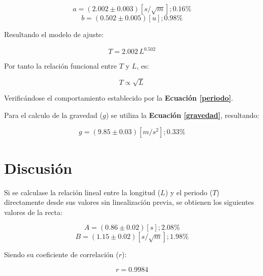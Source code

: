 \documentclass[letter,11pt]{article}
\begin{document}
\begin{equation*}
    a = (2.002 \pm 0.003) [s/\sqrt{m}]; 0.16\%
\end{equation*}
\begin{equation*}
    b = (0.502 \pm 0.005) [u]; 0.98\%
\end{equation*}
\vspace{0.10cm}

Resultando el modelo de ajuste:

\begin{equation*}
    T = 2.002\,L^{0.502}
\end{equation*}
\vspace{0.10cm}

Por tanto la relación funcional entre $T$ y $L$, es:

\begin{equation*}
    T \propto \sqrt{L}
\end{equation*}
\vspace{0.10cm}

Verificándose el comportamiento establecido por la
\textbf{Ecuación \ref{periodo}}.

Para el calculo de la gravedad ($g$) se utiliza la
\textbf{Ecuación \ref{gravedad}}, resultando:

\begin{equation*}
    g = (9.85 \pm 0.03) [m/s^2]; 0.33\%
\end{equation*}
\vspace{0.10cm}

\section{Discusión}

Si se calculase la relación lineal entre la longitud ($L$) y el periodo ($T$)
directamente desde sus valores sin linealización previa, se obtienen los
siguientes valores de la recta:

\begin{equation*}
    A = (0.86 \pm 0.02) [s]; 2.08\%
\end{equation*}
\begin{equation*}
    B = (1.15 \pm 0.02) [s/\sqrt{m}]; 1.98\%
\end{equation*}
\vspace{0.10cm}

Siendo su coeficiente de correlación ($r$):

\begin{equation*}
    r = 0.9984
\end{equation*}
\vspace{0.10cm}
\end{document}
